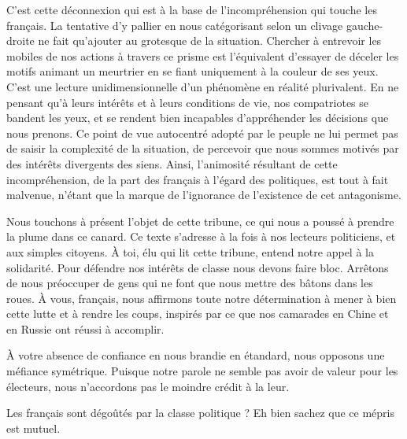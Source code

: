 \documentclass[french,12pt,amstex,a4paper]{article}
\begin{document}
C'est cette déconnexion qui est à la base de l'incompréhension qui touche les français. La tentative d'y pallier en nous catégorisant selon un clivage gauche-droite ne fait qu'ajouter au grotesque de la situation. Chercher à entrevoir les mobiles de nos actions à travers ce prisme est l'équivalent d'essayer de déceler les motifs animant un meurtrier en se fiant uniquement à la couleur de ses yeux. C'est une lecture unidimensionnelle d'un phénomène en réalité plurivalent. En ne pensant qu'à leurs intérêts et à leurs conditions de vie, nos compatriotes se bandent les yeux, et se rendent bien incapables d'appréhender les décisions que nous prenons. Ce point de vue autocentré adopté par le peuple ne lui permet pas de saisir la complexité de la situation, de percevoir que nous sommes motivés par des intérêts divergents des siens. Ainsi, l'animosité résultant de cette incompréhension, de la part des français à l'égard des politiques, est tout à fait malvenue, n'étant que la marque de l'ignorance de l'existence de cet antagonisme.

Nous touchons à présent l'objet de cette tribune, ce qui nous a poussé à prendre la plume dans ce canard. Ce texte s'adresse à la fois à nos lecteurs politiciens, et aux simples citoyens. À toi, élu qui lit cette tribune, entend notre appel à la solidarité. Pour défendre nos intérêts de classe nous devons faire bloc. Arrêtons de nous préoccuper de gens qui ne font que nous mettre des bâtons dans les roues. À vous, français, nous affirmons toute notre détermination à mener à bien cette lutte et à rendre les coups, inspirés par ce que nos camarades en Chine et en Russie ont réussi à accomplir.

À votre absence de confiance en nous brandie en étandard, nous opposons une méfiance symétrique. Puisque notre parole ne semble pas avoir de valeur pour les électeurs, nous n'accordons pas le moindre crédit à la leur.

Les français sont dégoûtés par la classe politique ? Eh bien sachez que ce mépris est mutuel.
\end{document}
